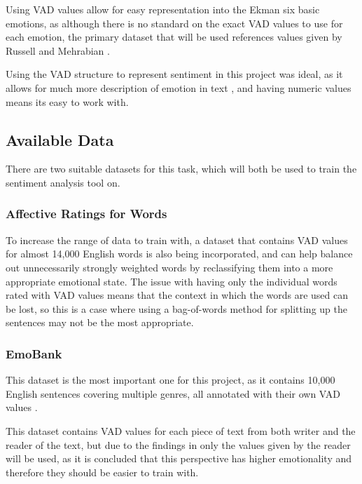 Using VAD values allow for easy representation into the Ekman six basic emotions, as although there is no standard on the exact VAD values to use for each emotion, the primary dataset that will be used references values given by Russell and Mehrabian \cite{VADMapping}.

Using the VAD structure to represent sentiment in this project was ideal, as it allows for much more description of emotion in text \cite{emotionPerspective}, and having numeric values means its easy to work with.


\subsection{Available Data}
There are two suitable datasets for this task, which will both be used to train the sentiment analysis tool on.

\subsubsection{Affective Ratings for Words}
To increase the range of data to train with, a dataset that contains VAD values for almost 14,000 English words\cite{wordsData} is also being incorporated, and can help balance out unnecessarily strongly weighted words by reclassifying them into a more appropriate emotional state. The issue with having only the individual words rated with VAD values means that the context in which the words are used can be lost, so this is a case where using a bag-of-words method for splitting up the sentences may not be the most appropriate.

\subsubsection{EmoBank}
This dataset is the most important one for this project, as it contains 10,000 English sentences covering multiple genres, all annotated with their own VAD values \cite{emoBank}.

This dataset contains VAD values for each piece of text from both writer and the reader of the text, but due to the findings in \cite{emoBank} only the values given by the reader will be used, as it is concluded that this perspective has higher emotionality and therefore they should be easier to train with.






